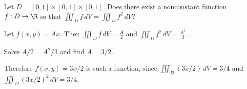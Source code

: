\documentclass{ximera}
\author{Jim Fowler}
\begin{document}
\begin{exercise}
  Let $D = [0,1] \times [0,1] \times [0,1]$.  Does there exist a
  nonconstant function $f : D \to \R$ so that
  $\iiint_D f \, dV = \iiint_D f^2 \, dV$?

  \begin{multipleChoice}
  \end{multipleChoice}
  
  \begin{hint}
    Let $f(x,y) = A x$.  Then 
    $\iiint_D f \, dV = \frac{A}{2}$ and $\iiint_D f^2 \, dV = \frac{A^2}{3}$.
  \end{hint}
  
  \begin{hint}
    Solve $A/2 = A^2 / 3$ and find $A = 3/2$.
  \end{hint}
  
  \begin{hint}
    Therefore $f(x,y) = 3x/2$ is such a function, since $\iiint_D (3x/2) \, dV = 3/4$ and $\iiint_D (3x/2)^2 \, dV = 3/4$.
  \end{hint}

\end{exercise}
\end{document}
